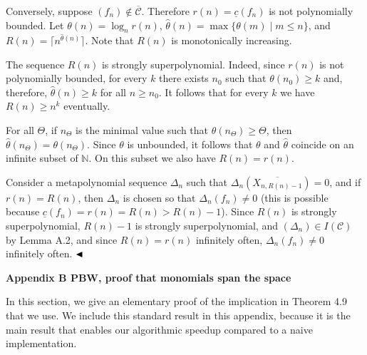 \documentclass[10pt,a4paper]{article}
\begin{document}
Conversely, suppose $(f_{n})\notin\overline{\mathcal{C}}$. Therefore $r(n)=\underline{c}(f_{n})$ is not polynomially bounded. Let $\theta(n)=\log_{n}r(n)$, $\hat{\theta}(n)=\max\{\theta(m)\mid m\leq n\}$, and $R(n)=\lceil n^{\hat{\theta}(n)}\rceil$. Note that $R(n)$ is monotonically increasing.





The sequence $R(n)$ is strongly superpolynomial.
Indeed, since $r(n)$ is not polynomially bounded, for every $k$ there exists $n_{0}$ such that $\theta(n_{0})\geq k$ and, therefore, $\hat{\theta}(n)\geq k$ for all $n\geq n_{0}$.
It follows that for every $k$ we have $R(n)\geq n^{k}$ eventually.





For all $\Theta$, if $n_{\Theta}$ is the minimal value such that $\theta(n_{\Theta})\geq\Theta$, then $\hat{\theta}(n_{\Theta})=\theta(n_{\Theta})$.
Since $\theta$ is unbounded, it follows that $\theta$ and $\hat{\theta}$ coincide on an infinite subset of $\mathbb{N}$.
On this subset we also have $R(n)=r(n)$.





Consider a metapolynomial sequence $\Delta_{n}$ such that $\Delta_{n}(\overline{X_{n,R(n)-1}})=0$, and if $r(n)=R(n)$, then $\Delta_{n}$ is chosen so that $\Delta_{n}(f_{n})\neq 0$ (this is possible because $\underline{c}(f_{n})=r(n)=R(n)>R(n)-1$).
Since $R(n)$ is strongly superpolynomial, $R(n)-1$ is strongly superpolynomial, and $(\Delta_{n})\in I(\mathcal{C})$ by Lemma A.2, and since $R(n)=r(n)$ infinitely often, $\Delta_{n}(f_{n})\neq 0$ infinitely often.
$\hfill\blacktriangleleft$







\par\medskip\noindent\textbf{Appendix B PBW, proof that monomials span the space}\par




In this section, we give an elementary proof of the implication in Theorem 4.9 that we use. We include this standard result in this appendix, because it is the main result that enables our algorithmic speedup compared to a naive implementation.
\end{document}
